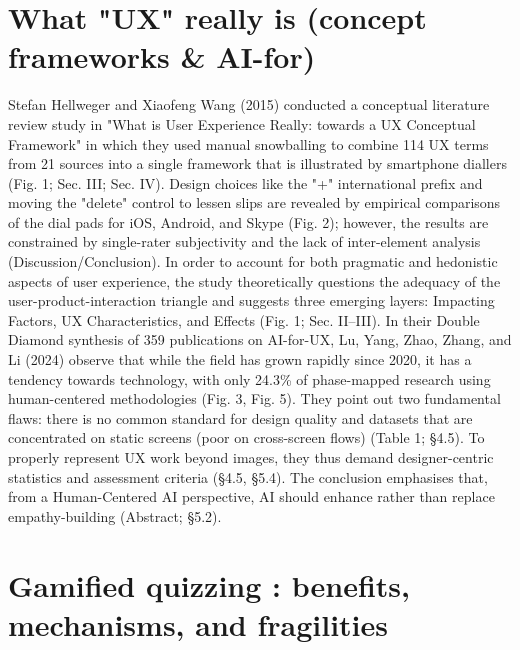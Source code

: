 \setlength{\parskip}{1em} 


\section{What "UX" really is (concept frameworks & AI-for)}

\setlength{\parskip}{1em} 

Stefan Hellweger and Xiaofeng Wang (2015) conducted a conceptual literature review study in "What is User Experience Really: towards a UX Conceptual Framework"\cite{hellweger2015what} in which they used manual snowballing to combine 114 UX terms from 21 sources into a single framework that is illustrated by smartphone diallers (Fig. 1; Sec. III; Sec. IV).  Design choices like the "+" international prefix and moving the "delete" control to lessen slips are revealed by empirical comparisons of the dial pads for iOS, Android, and Skype (Fig. 2); however, the results are constrained by single-rater subjectivity and the lack of inter-element analysis (Discussion/Conclusion).  In order to account for both pragmatic and hedonistic aspects of user experience, the study theoretically questions the adequacy of the user-product-interaction triangle and suggests three emerging layers: Impacting Factors, UX Characteristics, and Effects (Fig. 1; Sec. II–III). In their Double Diamond synthesis of 359 publications on AI-for-UX, Lu, Yang, Zhao, Zhang, and Li (2024)\cite{lu2024aiux} observe that while the field has grown rapidly since 2020, it has a tendency towards technology, with only 24.3\% of phase-mapped research using human-centered methodologies (Fig. 3, Fig. 5).
 They point out two fundamental flaws: there is no common standard for design quality and datasets that are concentrated on static screens (poor on cross-screen flows) (Table 1; §4.5).
 To properly represent UX work beyond images, they thus demand designer-centric statistics and assessment criteria (§4.5, §5.4).
 The conclusion emphasises that, from a Human-Centered AI perspective, AI should enhance rather than replace empathy-building (Abstract; §5.2).
\setlength{\parskip}{1em}

\section{Gamified quizzing : benefits, mechanisms, and fragilities}

